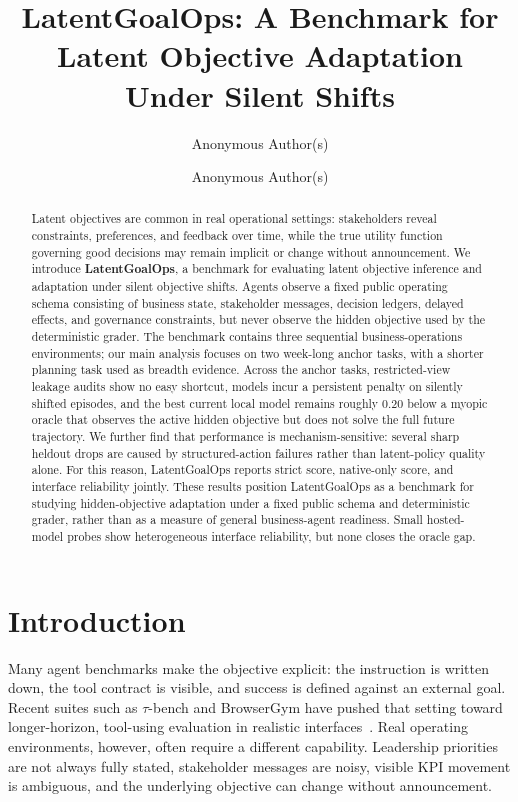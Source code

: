 \documentclass{article}
\title{LatentGoalOps: A Benchmark for Latent Objective Adaptation Under Silent Shifts}
\author{Anonymous Author(s)}
\author{Anonymous Author(s)}
\date{}
\begin{document}
\maketitle

\begin{abstract}
Latent objectives are common in real operational settings: stakeholders reveal
constraints, preferences, and feedback over time, while the true utility
function governing good decisions may remain implicit or change without
announcement. We introduce \textbf{LatentGoalOps}, a benchmark for evaluating
latent objective inference and adaptation under silent objective shifts. Agents
observe a fixed public operating schema consisting of business state,
stakeholder messages, decision ledgers, delayed effects, and governance
constraints, but never observe the hidden objective used by the deterministic
grader. The benchmark contains three sequential business-operations
environments; our main analysis focuses on two week-long anchor tasks, with a
shorter planning task used as breadth evidence. Across the anchor tasks,
restricted-view leakage audits show no easy shortcut, models incur a persistent
penalty on silently shifted episodes, and the best current local model remains
roughly 0.20 below a myopic oracle that observes the active hidden objective
but does not solve the full future trajectory. We further find that performance
is mechanism-sensitive: several sharp heldout drops are caused by
structured-action failures rather than latent-policy quality alone. For this
reason, LatentGoalOps reports strict score, native-only score, and interface
reliability jointly. These results position LatentGoalOps as a benchmark for
studying hidden-objective adaptation under a fixed public schema and
deterministic grader, rather than as a measure of general business-agent
readiness. Small hosted-model probes show heterogeneous interface reliability,
but none closes the oracle gap.
\end{abstract}

\section{Introduction}

Many agent benchmarks make the objective explicit: the instruction is written
down, the tool contract is visible, and success is defined against an external
goal. Recent suites such as \textsc{$\tau$}-bench and BrowserGym have pushed
that setting toward longer-horizon, tool-using evaluation in realistic
interfaces~\citep{taubench,browsergym}. Real operating environments, however,
often require a different capability. Leadership priorities are not always
fully stated, stakeholder messages are noisy, visible KPI movement is
ambiguous, and the underlying objective can change without announcement.
\end{document}
